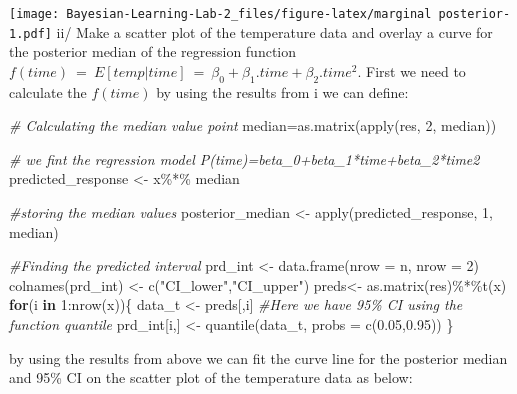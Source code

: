 \documentclass[
]{article}
\newenvironment{Shaded}{\begin{snugshade}}{\end{snugshade}}
\newcommand{\AttributeTok}[1]{\textcolor[rgb]{0.77,0.63,0.00}{#1}}
\newcommand{\CommentTok}[1]{\textcolor[rgb]{0.56,0.35,0.01}{\textit{#1}}}
\newcommand{\ControlFlowTok}[1]{\textcolor[rgb]{0.13,0.29,0.53}{\textbf{#1}}}
\newcommand{\DecValTok}[1]{\textcolor[rgb]{0.00,0.00,0.81}{#1}}
\newcommand{\FloatTok}[1]{\textcolor[rgb]{0.00,0.00,0.81}{#1}}
\newcommand{\FunctionTok}[1]{\textcolor[rgb]{0.00,0.00,0.00}{#1}}
\newcommand{\NormalTok}[1]{#1}
\newcommand{\OtherTok}[1]{\textcolor[rgb]{0.56,0.35,0.01}{#1}}
\newcommand{\SpecialCharTok}[1]{\textcolor[rgb]{0.00,0.00,0.00}{#1}}
\newcommand{\StringTok}[1]{\textcolor[rgb]{0.31,0.60,0.02}{#1}}
\begin{document}
\texttt{[image: Bayesian-Learning-Lab-2\_files/figure-latex/marginal posterior-1.pdf]}
ii/ Make a scatter plot of the temperature data and overlay a curve for
the posterior median of the regression function
\(f(time)\ = \ E[temp|time]\ =\ \beta_0+\beta_1.time+\beta_2.time^2\).
First we need to calculate the \(f(time)\) by using the results from i
we can define:

\begin{Shaded}
\begin{Highlighting}[]
\CommentTok{\# Calculating the median value point}
\NormalTok{median}\OtherTok{=}\FunctionTok{as.matrix}\NormalTok{(}\FunctionTok{apply}\NormalTok{(res, }\DecValTok{2}\NormalTok{, median))}

\CommentTok{\# we fint the regression  model P(time)=beta\_0+beta\_1*time+beta\_2*time2}
\NormalTok{predicted\_response }\OtherTok{\textless{}{-}}\NormalTok{ x}\SpecialCharTok{\%*\%}\NormalTok{ median}

\CommentTok{\#storing the median values}
\NormalTok{posterior\_median }\OtherTok{\textless{}{-}} \FunctionTok{apply}\NormalTok{(predicted\_response, }\DecValTok{1}\NormalTok{, median)}

\CommentTok{\#Finding the predicted interval}
\NormalTok{prd\_int }\OtherTok{\textless{}{-}} \FunctionTok{data.frame}\NormalTok{(}\AttributeTok{nrow =}\NormalTok{ n, }\AttributeTok{nrow =} \DecValTok{2}\NormalTok{)}
\FunctionTok{colnames}\NormalTok{(prd\_int) }\OtherTok{\textless{}{-}} \FunctionTok{c}\NormalTok{(}\StringTok{"CI\_lower"}\NormalTok{,}\StringTok{"CI\_upper"}\NormalTok{)}
\NormalTok{preds}\OtherTok{\textless{}{-}} \FunctionTok{as.matrix}\NormalTok{(res)}\SpecialCharTok{\%*\%}\FunctionTok{t}\NormalTok{(x)}
\ControlFlowTok{for}\NormalTok{(i }\ControlFlowTok{in} \DecValTok{1}\SpecialCharTok{:}\FunctionTok{nrow}\NormalTok{(x))\{}
\NormalTok{  data\_t }\OtherTok{\textless{}{-}}\NormalTok{ preds[,i]}
  \CommentTok{\#Here we have 95\% CI using the function quantile}
\NormalTok{  prd\_int[i,] }\OtherTok{\textless{}{-}} \FunctionTok{quantile}\NormalTok{(data\_t, }\AttributeTok{probs =} \FunctionTok{c}\NormalTok{(}\FloatTok{0.05}\NormalTok{,}\FloatTok{0.95}\NormalTok{))}
\NormalTok{\}}
\end{Highlighting}
\end{Shaded}

by using the results from above we can fit the curve line for the
posterior median and 95\% CI on the scatter plot of the temperature data
as below:
\end{document}
